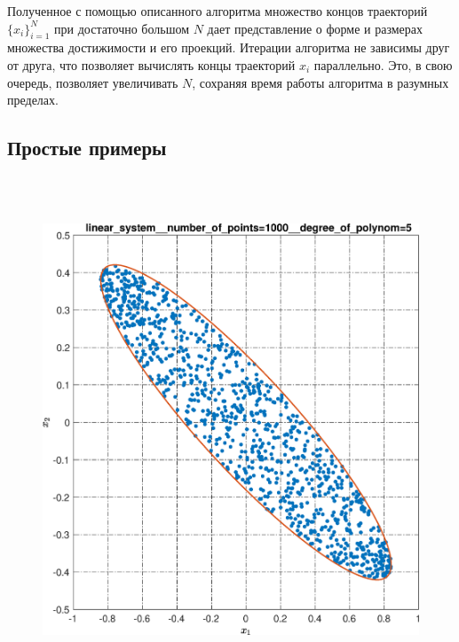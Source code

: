 \documentclass[../main.tex]{subfiles}
\begin{document}
  Полученное с помощью описанного алгоритма множество концов траекторий $\{x_i\}_{i = 1}^{N}$ при достаточно большом $N$ дает представление о форме и размерах множества достижимости и его проекций. 
  Итерации алгоритма не зависимы друг от друга, что позволяет вычислять концы траекторий $x_i$ параллельно. 
  Это, в свою очередь, позволяет увеличивать $N$, сохраняя время работы алгоритма в разумных пределах.
  
  \subsection{Простые примеры}
  \begin{figure}[ht!] 
  	\hspace{-2.5ex}
  	\begin{minipage}[b]{.4\linewidth} 
  		\small
  		\centering 
  		\includegraphics[width=\linewidth]{images/linear_system__number_of_points=1000__degree_of_polynom=5.eps}
  	\end{minipage}
  	\hfill
  	\begin{minipage}[b]{.4\linewidth} 
  		\small
  		\centering

\end{minipage}
\end{figure}
\end{document}
